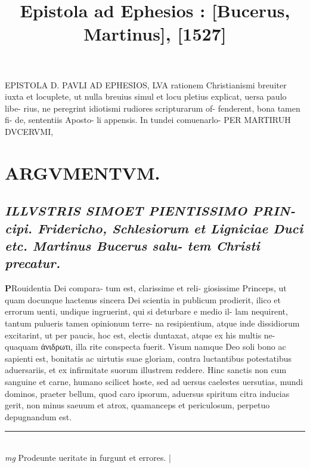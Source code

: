 \documentclass{article}
\begin{document}
\date{}
        \title{ Epistola ad Ephesios : [Bucerus, Martinus], [1527]}
\maketitle
\tableofcontents
\clearpage
\begin{pages} 
\beginnumbering
        EPISTOLA D. PAVLI AD EPHESIOS, LVA rationem Christianismi breuiter iuxta et locuplete, ut nulla breuius simul et locu pletius explicat, uersa paulo libe- rius, ne peregrint idiotismi rudiores scripturarum of- fenderent, bona tamen fi- de, sententiis Aposto- li appensis. In tundei comuenarlo- PER MARTIRUH DVCERVMI, 
\section*{ARGVMENTVM.  }
{}
\subsection*{\textit{ILLVSTRIS SIMOET PIENTISSIMO PRIN- cipi.  Fridericho, Schlesiorum et Ligniciae Duci etc. Martinus Bucerus salu- tem Christi precatur. }}\pstart \huge\textbf{P}\normalsize Rouidentia Dei compara- tum est, clarissime et reli- giosissime Princeps, ut quam docunque hactenus sincera Dei scientia in publicum prodierit, ilico et errorum uenti, undique ingruerint, qui si deturbare e medio il- lam nequirent, tantum pulueris tamen opinionum terre- na resipientium, atque inde dissidiorum excitarint, ut per paucis, hoc est, electis duntaxat, atque ex his multis ne- quaquam ἀνιδρωτι, illa rite conspecta fuerit. Visum namque Deo soli bono ac sapienti est, bonitatis ac uirtutis suae gloriam, contra luctantibus potestatibus aduersariis, et ex infirmitate suorum illustrem reddere. Hinc sanctis non cum sanguine et carne, humano scilicet hoste, sed ad uersus caelestes uersutias, mundi dominos, praeter bellum, quod caro ipsorum, aduersus spiritum citra inducias gerit, non minus saeuum et atrox, quamanceps et periculosum, perpetuo depugnandum est.   \pend
\vspace{0.5cm}\noindent
\vspace{0.2cm}\rule{1cm}{0.2pt}\\ 
\hspace{0.2cm}\textit{mg}
\footnotesize Prodeunte ueritate in furgunt et errores. 
\normalsize| 

\end{pages}
\end{document}
